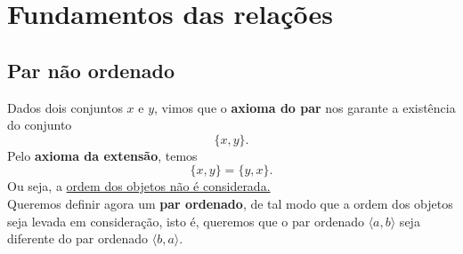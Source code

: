 \section{Fundamentos das relações}
   \subsection{Par não ordenado}
      Dados dois conjuntos $x$ e $y$, vimos que o \textbf{axioma do par} nos garante a existência do conjunto
      $$\{x, y\}.$$
      Pelo \textbf{axioma da extensão}, temos
      $$\{x,y\} = \{y,x\}.$$
      Ou seja, a \underline{ordem dos objetos não é considerada.}\\
      Queremos definir agora um \textbf{par ordenado}, de tal modo que a ordem dos objetos seja levada em consideração, isto é, queremos que o par ordenado $\langle a ,b\rangle$ seja diferente do par ordenado $\langle b ,a\rangle$.
